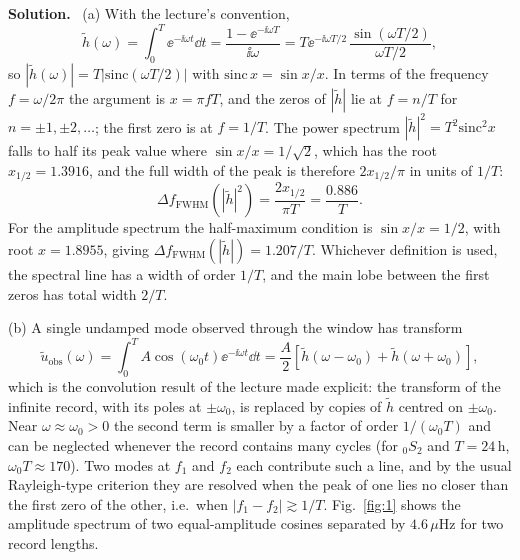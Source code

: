 \documentclass[a4paper,12pt]{paper}
\newenvironment{solution}{\par\noindent\textbf{Solution.}\ }{\par\medskip}
\begin{document}
\begin{solution}
(a) With the lecture's convention,
\begin{equation}
\tilde{h}(\omega)=\int_{0}^{T}\ee^{-\ii\omega t}\dd t=\frac{1-\ee^{-\ii\omega T}}{\ii\omega}
=T\ee^{-\ii\omega T/2}\,\frac{\sin(\omega T/2)}{\omega T/2},
\label{eq:28}
\end{equation}
so $|\tilde{h}(\omega)|=T|\mathrm{sinc}(\omega T/2)|$ with $\mathrm{sinc}\,x=\sin x/x$. In terms of the
frequency $f=\omega/2\pi$ the argument is $x=\pi fT$, and the zeros of $|\tilde{h}|$ lie at $f=n/T$ for
$n=\pm 1,\pm 2,\dots$; the first zero is at $f=1/T$. The power spectrum $|\tilde{h}|^{2}=T^{2}\mathrm{sinc}^{2}x$
falls to half its peak value where $\sin x/x=1/\sqrt{2}$, which has the root $x_{1/2}=1.3916$, and the
full width of the peak is therefore $2x_{1/2}/\pi$ in units of $1/T$:
\begin{equation}
\Delta f_{\mathrm{FWHM}}\left(|\tilde{h}|^{2}\right)=\frac{2x_{1/2}}{\pi T}=\frac{0.886}{T}.
\label{eq:29}
\end{equation}
For the amplitude spectrum the half-maximum condition is $\sin x/x=1/2$, with root $x=1.8955$, giving
$\Delta f_{\mathrm{FWHM}}(|\tilde{h}|)=1.207/T$. Whichever definition is used, the spectral line has a
width of order $1/T$, and the main lobe between the first zeros has total width $2/T$.

(b) A single undamped mode observed through the window has transform
\begin{equation}
\tilde{u}_{\mathrm{obs}}(\omega)=\int_{0}^{T}A\cos(\omega_{0}t)\ee^{-\ii\omega t}\dd t
=\frac{A}{2}\left[\tilde{h}(\omega-\omega_{0})+\tilde{h}(\omega+\omega_{0})\right],
\label{eq:30}
\end{equation}
which is the convolution result of the lecture made explicit: the transform of the infinite record,
with its poles at $\pm\omega_{0}$, is replaced by copies of $\tilde{h}$ centred on $\pm\omega_{0}$. Near
$\omega\approx\omega_{0}>0$ the second term is smaller by a factor of order $1/(\omega_{0}T)$ and can be
neglected whenever the record contains many cycles (for $_{0}S_{2}$ and $T=24\,\mathrm{h}$,
$\omega_{0}T\approx 170$). Two modes at $f_{1}$ and $f_{2}$ each contribute such a line, and by the
usual Rayleigh-type criterion they are resolved when the peak of one lies no closer than the first zero
of the other, i.e.\ when $|f_{1}-f_{2}|\gtrsim 1/T$. Fig.~\ref{fig:1} shows the amplitude spectrum of
two equal-amplitude cosines separated by $4.6\,\mu\mathrm{Hz}$ for two record lengths.


\end{solution}
\end{document}
